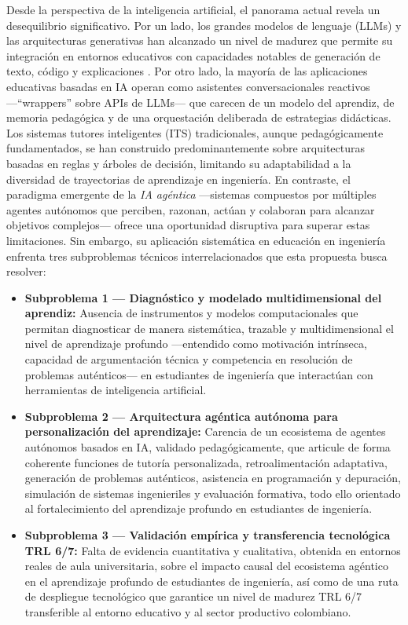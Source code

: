 Desde la perspectiva de la inteligencia artificial, el panorama actual revela un
desequilibrio significativo. Por un lado, los grandes modelos de lenguaje (LLMs) y las
arquitecturas generativas han alcanzado un nivel de madurez que permite su integración en
entornos educativos con capacidades notables de generación de texto, código y explicaciones
\cite{wang2024survey, park2023generative}. Por otro lado, la mayoría de las aplicaciones
educativas basadas en IA operan como asistentes conversacionales reactivos —``wrappers''
sobre APIs de LLMs— que carecen de un modelo del aprendiz, de memoria pedagógica y de una
orquestación deliberada de estrategias didácticas. Los sistemas tutores inteligentes (ITS)
tradicionales, aunque pedagógicamente fundamentados, se han construido predominantemente
sobre arquitecturas basadas en reglas y árboles de decisión, limitando su adaptabilidad a
la diversidad de trayectorias de aprendizaje en ingeniería. En contraste, el paradigma
emergente de la \emph{IA agéntica} —sistemas compuestos por múltiples agentes autónomos que
perciben, razonan, actúan y colaboran para alcanzar objetivos complejos— ofrece una
oportunidad disruptiva para superar estas limitaciones. Sin embargo, su aplicación
sistemática en educación en ingeniería enfrenta tres subproblemas técnicos interrelacionados
que esta propuesta busca resolver:

\begin{itemize}
    \item \textbf{Subproblema 1 — Diagnóstico y modelado multidimensional del aprendiz:}
    Ausencia de instrumentos y modelos computacionales que permitan diagnosticar de manera
    sistemática, trazable y multidimensional el nivel de aprendizaje profundo —entendido
    como motivación intrínseca, capacidad de argumentación técnica y competencia en
    resolución de problemas auténticos— en estudiantes de ingeniería que interactúan con
    herramientas de inteligencia artificial.

    \item \textbf{Subproblema 2 — Arquitectura agéntica autónoma para personalización del
    aprendizaje:} Carencia de un ecosistema de agentes autónomos basados en IA, validado
    pedagógicamente, que articule de forma coherente funciones de tutoría personalizada,
    retroalimentación adaptativa, generación de problemas auténticos, asistencia en
    programación y depuración, simulación de sistemas ingenieriles y evaluación formativa,
    todo ello orientado al fortalecimiento del aprendizaje profundo en estudiantes de
    ingeniería.

    \item \textbf{Subproblema 3 — Validación empírica y transferencia tecnológica TRL 6/7:}
    Falta de evidencia cuantitativa y cualitativa, obtenida en entornos reales de aula
    universitaria, sobre el impacto causal del ecosistema agéntico en el aprendizaje
    profundo de estudiantes de ingeniería, así como de una ruta de despliegue tecnológico
    que garantice un nivel de madurez TRL 6/7 transferible al entorno educativo y al
    sector productivo colombiano.
\end{itemize}

